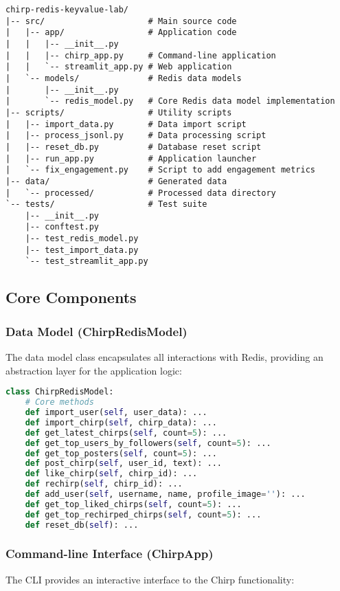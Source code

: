 \documentclass[a4paper,11pt]{article}
\begin{document}
\begin{verbatim}
chirp-redis-keyvalue-lab/
|-- src/                     # Main source code 
|   |-- app/                 # Application code
|   |   |-- __init__.py
|   |   |-- chirp_app.py     # Command-line application
|   |   `-- streamlit_app.py # Web application
|   `-- models/              # Redis data models
|       |-- __init__.py      
|       `-- redis_model.py   # Core Redis data model implementation
|-- scripts/                 # Utility scripts
|   |-- import_data.py       # Data import script
|   |-- process_jsonl.py     # Data processing script
|   |-- reset_db.py          # Database reset script
|   |-- run_app.py           # Application launcher
|   `-- fix_engagement.py    # Script to add engagement metrics
|-- data/                    # Generated data
|   `-- processed/           # Processed data directory
`-- tests/                   # Test suite
    |-- __init__.py
    |-- conftest.py
    |-- test_redis_model.py
    |-- test_import_data.py
    `-- test_streamlit_app.py
\end{verbatim}

\subsection{Core Components}

\subsubsection{Data Model (ChirpRedisModel)}
The data model class encapsulates all interactions with Redis, providing an abstraction layer for the application logic:

\begin{lstlisting}[language=Python, caption=Key methods in the ChirpRedisModel class]
class ChirpRedisModel:
    # Core methods
    def import_user(self, user_data): ...
    def import_chirp(self, chirp_data): ...
    def get_latest_chirps(self, count=5): ...
    def get_top_users_by_followers(self, count=5): ...
    def get_top_posters(self, count=5): ...
    def post_chirp(self, user_id, text): ...
    def like_chirp(self, chirp_id): ...
    def rechirp(self, chirp_id): ...
    def add_user(self, username, name, profile_image=''): ...
    def get_top_liked_chirps(self, count=5): ...
    def get_top_rechirped_chirps(self, count=5): ...
    def reset_db(self): ...
\end{lstlisting}

\subsubsection{Command-line Interface (ChirpApp)}
The CLI provides an interactive interface to the Chirp functionality:
\end{document}
